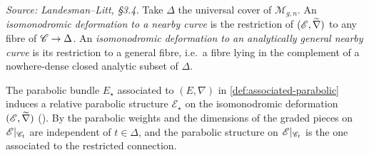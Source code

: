 \begin{definition}
  \label{def:nearby}
  \textit{Source: Landesman--Litt, \S3.4.}
  Take $\Delta$ the universal cover of $\mathscr{M}_{g,n}$. An \emph{isomonodromic
  deformation to a nearby curve} is the restriction of
  $(\mathscr{E},\widetilde{\nabla})$ to any fibre of $\mathscr{C} \to \Delta$. An
  \emph{isomonodromic deformation to an analytically general nearby curve} is its
  restriction to a general fibre, i.e.\ a fibre lying in the complement of a
  nowhere-dense closed analytic subset of $\Delta$.
\end{definition}

\begin{remark}
  \label{rem:parabolic-on-iso}
  The parabolic bundle $E_\star$ associated to $(E,\nabla)$ in
  \cref{def:associated-parabolic} induces a relative parabolic structure
  $\mathscr{E}_\star$ on the isomonodromic deformation
  $(\mathscr{E},\widetilde{\nabla})$ (\cite[\S4.3]{BHH:parabolic}). By
  \cite[Lemma 4.2]{BHH:parabolic} the parabolic weights and the dimensions of
  the graded pieces on $\mathscr{E}|_{\mathscr{C}_t}$ are independent of $t \in \Delta$, and the
  parabolic structure on $\mathscr{E}|_{\mathscr{C}_t}$ is the one associated to the restricted
  connection.
\end{remark}

